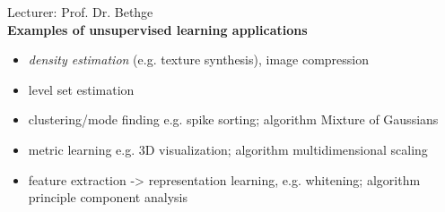 {\Large Lecturer: Prof. Dr. Bethge}\\[1cm]

\textbf{Examples of unsupervised learning applications}
\begin{itemize}
	\item \emph{density estimation} (e.g. texture synthesis), image compression
	\item level set estimation
	\item clustering/mode finding e.g. spike sorting; algorithm Mixture of Gaussians
	\item metric learning e.g. 3D visualization; algorithm multidimensional scaling
	\item feature extraction -> representation learning, e.g. whitening; algorithm principle component analysis
\end{itemize}

